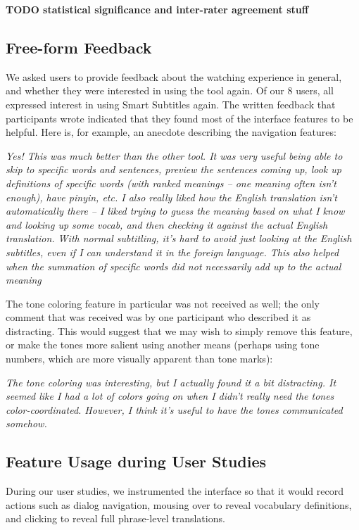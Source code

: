 \documentclass{sigchi}
\begin{document}
\textbf{TODO statistical significance and inter-rater agreement stuff}

\subsection{Free-form Feedback}

We asked users to provide feedback about the watching experience in general, and whether they were interested in using the tool again. Of our 8 users, all expressed interest in using Smart Subtitles again. The written feedback that participants wrote indicated that they found most of the interface features to be helpful. Here is, for example, an anecdote describing the navigation features:
	 	 	
\emph{Yes! This was much better than the other tool. It was very useful being able to skip to specific words and sentences, preview the sentences coming up, look up definitions of specific words (with ranked meanings – one meaning often isn't enough), have pinyin, etc. I also really liked how the English translation isn't automatically there – I liked trying to guess the meaning based on what I know and looking up some vocab, and then checking it against the actual English translation. With normal subtitling, it's hard to avoid just looking at the English subtitles, even if I can understand it in the foreign language. This also helped when the summation of specific words did not necessarily add up to the actual meaning}

The tone coloring feature in particular was not received as well; the only comment that was received was by one participant who described it as distracting. This would suggest that we may wish to simply remove this feature, or make the tones more salient using another means (perhaps using tone numbers, which are more visually apparent than tone marks):
	 	 	
\emph{The tone coloring was interesting, but I actually found it a bit distracting. It seemed like I had a lot of colors going on when I didn't really need the tones color-coordinated. However, I think it's useful to have the tones communicated somehow.}

\subsection{Feature Usage during User Studies}

During our user studies, we instrumented the interface so that it would record actions such as dialog navigation, mousing over to reveal vocabulary definitions, and clicking to reveal full phrase-level translations.
\end{document}
